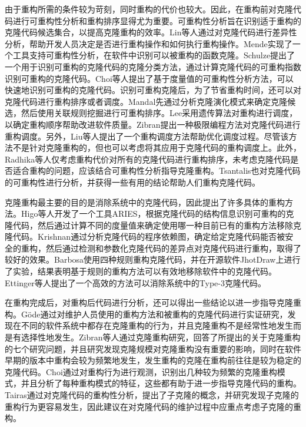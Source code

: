 由于重构所需的条件较为苛刻，同时重构的代价也较大。因此，在重构前对克隆代码进行可重构性分析和重构排序显得尤为重要。可重构性分析旨在识别适于重构的克隆代码候选集合，以提高克隆重构的效率\cite{lin2014detecting}\cite{mende2009evaluation}\cite{schulze2008towards}\cite{choi2011extracting}。Lin等人通过对克隆代码进行差异性分析，帮助开发人员决定是否进行重构操作和如何执行重构操作\cite{lin2014detecting}。Mende实现了一个工具支持可重构性分析，在软件中识别可以被重构的函数克隆\cite{mende2009evaluation}。Schulze提出了一个用于识别可重构的克隆代码的克隆分类方法，通过计算克隆代码的可重构指数识别可重构的克隆代码\cite{schulze2008towards}。Choi等人提出了基于度量值的可重构性分析方法，可以快速地识别可重构的克隆代码\cite{choi2011extracting}。识别可重构克隆后，为了节省重构时间，还可以对克隆代码进行重构排序或者调度\cite{mandal2014automatic}\cite{lee2011automated}\cite{zibran2011constraint}。Mandal先通过分析克隆演化模式来确定克隆候选，然后使用关联规则挖掘进行可重构排序\cite{mandal2014automatic}。Lee采用遗传算法对重构进行调度，以确定重构顺序帮助改进软件质量\cite{lee2011automated}。Zibran提出一种极限编程方法对克隆代码进行重构调度\cite{zibran2011constraint}。另外，Liu等人提出了一个重构调度方法帮助优化调度过程\cite{liu2012schedule}。尽管该方法不是针对克隆重构的，但也可以考虑将其应用于克隆代码的重构调度上。此外，Radhika等人仅考虑重构代价对所有的克隆代码进行重构排序，未考虑克隆代码是否适合重构的问题\cite{venkatasubramanyam2013prioritizing}，应该结合可重构性分析指导克隆重构。Tsantalis也对克隆代码的可重构性进行分析，并获得一些有用的结论帮助人们重构克隆代码\cite{tsantalis2015assessing}。

克隆重构最主要的目的是消除系统中的克隆代码，因此提出了许多具体的重构方法\cite{higo2008metric}\cite{krishnan2014unification}\cite{barbosa2013removing}\cite{ettinger2017efficient}。Higo等人开发了一个工具ARIES，根据克隆代码的结构信息识别可重构的克隆代码，然后通过计算不同的度量值来确定使用哪一种目前已有的重构方法移除克隆代码\cite{higo2008metric}。Krishnan通过分析克隆代码的程序依赖图，确定给定克隆代码能否被安全的重构，然后通过检测和参数化克隆代码的差异点对克隆代码进行重构，取得了较好的效果\cite{krishnan2014unification}。Barbosa使用四种规则重构克隆代码，并在开源软件JhotDraw上进行了实验，结果表明基于规则的重构方法可以有效地移除软件中的克隆代码\cite{barbosa2013removing}。Ettinger等人提出了一个高效的方法可以消除系统中的Type-3克隆代码\cite{ettinger2017efficient}。

在重构完成后，对重构后代码进行分析，还可以得出一些结论以进一步指导克隆重构\cite{gode2010clone}\cite{zibran2013evaluating}\cite{eunjong2014investigation}\cite{eunjong2014investigation}。G{\"o}de通过对维护人员使用的重构方法和被重构的克隆代码进行实证研究，发现在不同的软件系统中都存在克隆重构的行为，并且克隆重构不是经常性地发生而是有选择性地发生\cite{gode2010clone}。Zibran等人通过克隆重构研究，回答了所提出的关于克隆重构的七个研究问题，并且研究发现克隆规模对克隆重构没有重要的影响，同时在软件早期的版本中重构会较为频繁地发生，发生重构的克隆在重构前往往是较为稳定的克隆代码\cite{zibran2013evaluating}。Choi通过对重构行为进行观测，识别出几种较为频繁的克隆重构模式，并且分析了每种重构模式的特征，这些都有助于进一步指导克隆代码的重构\cite{eunjong2014investigation}。Tairas通过对克隆代码的重构性分析，提出了子克隆的概念，并研究发现子克隆的重构行为更容易发生，因此建议在对克隆代码的维护过程中应重点考虑子克隆的重构\cite{tairas2010sub}。


